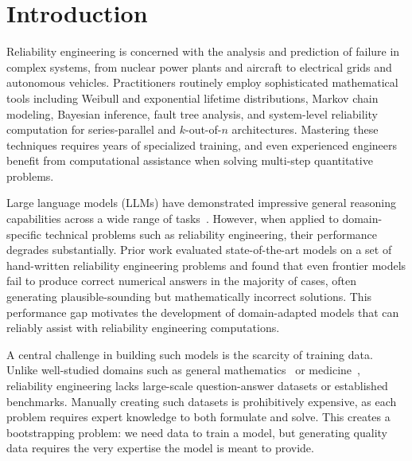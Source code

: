 \section{Introduction}
\label{sec:intro}

Reliability engineering is concerned with the analysis and prediction of failure in complex systems, from nuclear power plants and aircraft to electrical grids and autonomous vehicles. Practitioners routinely employ sophisticated mathematical tools including Weibull and exponential lifetime distributions, Markov chain modeling, Bayesian inference, fault tree analysis, and system-level reliability computation for series-parallel and $k$-out-of-$n$ architectures. Mastering these techniques requires years of specialized training, and even experienced engineers benefit from computational assistance when solving multi-step quantitative problems.

Large language models (LLMs) have demonstrated impressive general reasoning capabilities across a wide range of tasks~\cite{openai2023gpt4}. However, when applied to domain-specific technical problems such as reliability engineering, their performance degrades substantially. Prior work evaluated state-of-the-art models on a set of hand-written reliability engineering problems and found that even frontier models fail to produce correct numerical answers in the majority of cases, often generating plausible-sounding but mathematically incorrect solutions. This performance gap motivates the development of domain-adapted models that can reliably assist with reliability engineering computations.

A central challenge in building such models is the scarcity of training data. Unlike well-studied domains such as general mathematics~\cite{yu2024metamath,hendrycks2021math} or medicine~\cite{singhal2023medpalm}, reliability engineering lacks large-scale question-answer datasets or established benchmarks. Manually creating such datasets is prohibitively expensive, as each problem requires expert knowledge to both formulate and solve. This creates a bootstrapping problem: we need data to train a model, but generating quality data requires the very expertise the model is meant to provide.

